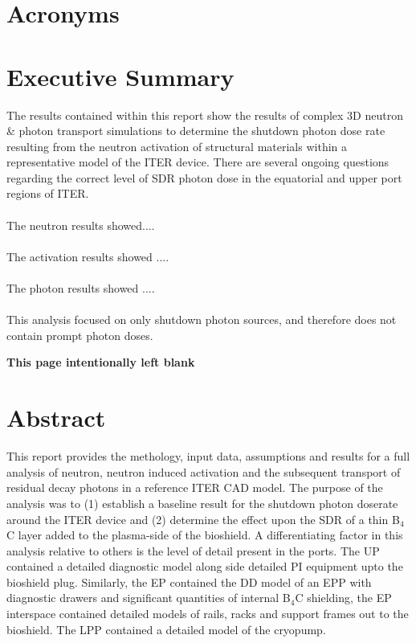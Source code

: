 \documentclass[12pt]{article}
\newcommand*{\blankpage}{%
\vspace*{\fill}
\begin{center}
 \centering \textbf{This page intentionally left blank}
\end{center}
\vspace{\fill}}
\renewcommand{\listoffigures}{\begingroup
\tocsection
\tocfile{\listfigurename}{lof}
\endgroup}
\renewcommand{\listoftables}{\begingroup
\tocsection
\tocfile{\listtablename}{lot}
\endgroup}
\begin{document}
\maketitle
\newpage
\tableofcontents
\newpage
\listoffigures
\newpage
\listoftables
\newpage
\section*{Acronyms}
\newpage
\section*{Executive Summary}
The results contained within this report show the results of complex 3D neutron
\& photon transport simulations to determine the shutdown photon dose rate
resulting from the neutron activation of structural materials within a
representative model of the ITER device. There are several ongoing questions
regarding the correct level of SDR photon dose in the equatorial and upper port
regions of ITER.
\\
\\
The neutron results showed....
\\
\\
The activation results showed ....
\\
\\
The photon results showed ....
\\
\\
This analysis focused on only shutdown photon sources, and therefore does not
contain prompt photon doses.
\newpage
\blankpage
\newpage
\section*{Abstract}
This report provides the methology, input data, assumptions and results for a
full analysis of neutron, neutron induced activation and the subsequent
transport of residual decay photons in a reference ITER CAD model. The purpose
of the analysis was to (1) establish a baseline result for the shutdown photon
doserate around the ITER device and (2) determine the effect upon the SDR of a
thin B$_4$C layer added to the plasma-side of the bioshield. A differentiating
factor in this analysis relative to others is the level of detail present in
the ports. The UP contained a detailed diagnostic model along side detailed PI
equipment upto the bioshield plug. Similarly, the EP contained the DD model of
an EPP with diagnostic drawers and significant quantities of internal B$_4$C
shielding, the EP interspace contained detailed models of rails, racks and
support frames out to the bioshield. The LPP contained a detailed model of the
cryopump. 
\newpage
\end{document}

